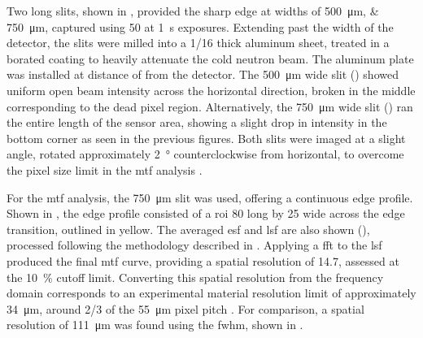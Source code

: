 \documentclass[../../../main.tex]{subfiles}%
\begin{document}
    Two long slits, shown in , provided the sharp edge at widths of \SIlist[list-units={repeat}]{500; 750}{\micro\meter}, captured using \SI{50}{\frames} at \SI{1}{\second} exposures.
    Extending past the width of the detector, the slits were milled into a \SI{1/16}{\inch} thick aluminum sheet, treated in a borated coating to heavily attenuate the cold neutron beam.
    The aluminum plate was installed at distance of  from the detector.
    The \SI{500}{\micro\meter} wide slit () showed uniform open beam intensity across the horizontal direction, broken in the middle corresponding to the dead pixel region.
    Alternatively, the \SI{750}{\micro\meter} wide slit () ran the entire length of the sensor area, showing a slight drop in intensity in the bottom corner as seen in the previous figures.
    Both slits were imaged at a slight angle, rotated approximately \SI{2}{\degree} counterclockwise from horizontal, to overcome the pixel size limit in the \gls{mtf} analysis \cite{Herrera_2018}.
    \par%
    For the \gls{mtf} analysis, the \SI{750}{\micro\meter} slit was used, offering a continuous edge profile.
    Shown in , the edge profile consisted of a \gls{roi} \SI{80}{\pixels} long by \SI{25}{\pixels} wide across the edge transition, outlined in yellow.
    The averaged \gls{esf} and \gls{lsf} are also shown (), processed following the methodology described in .
    Applying a \gls{fft} to the \gls{lsf} produced the final \gls{mtf} curve, providing a spatial resolution of \SI{14.7}{\linepairs}, assessed at the \SI{10}{\percent} cutoff limit.
    Converting this spatial resolution from the frequency domain corresponds to an experimental material resolution limit of approximately \SI{34}{\micro\meter}, around \num{2/3} of the \SI{55}{\micro\meter} pixel pitch \cite{Herrera_2018}.
    For comparison, a spatial resolution of \SI{111}{\micro\meter} was found using the \gls{fwhm}, shown in .
\end{document}
